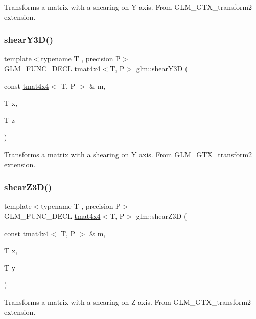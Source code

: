Transforms a matrix with a shearing on Y axis. From G\+L\+M\+\_\+\+G\+T\+X\+\_\+transform2 extension. \mbox{\label{group__gtx__transform2_ga31253ea18fdcdfde08c134c8b67688f7}} 
\subsubsection{\texorpdfstring{shear\+Y3\+D()}{shearY3D()}}
{\footnotesize\ttfamily template$<$typename T , precision P$>$ \\
G\+L\+M\+\_\+\+F\+U\+N\+C\+\_\+\+D\+E\+CL \hyperlink{structglm_1_1tmat4x4}{tmat4x4}$<$T, P$>$ glm\+::shear\+Y3D (\begin{DoxyParamCaption}\item[{const \hyperlink{structglm_1_1tmat4x4}{tmat4x4}$<$ T, P $>$ \&}]{m,  }\item[{T}]{x,  }\item[{T}]{z }\end{DoxyParamCaption})}

Transforms a matrix with a shearing on Y axis. From G\+L\+M\+\_\+\+G\+T\+X\+\_\+transform2 extension. \mbox{\label{group__gtx__transform2_ga5558ac64a7144685bf2eb4483a0e2f51}} 
\subsubsection{\texorpdfstring{shear\+Z3\+D()}{shearZ3D()}}
{\footnotesize\ttfamily template$<$typename T , precision P$>$ \\
G\+L\+M\+\_\+\+F\+U\+N\+C\+\_\+\+D\+E\+CL \hyperlink{structglm_1_1tmat4x4}{tmat4x4}$<$T, P$>$ glm\+::shear\+Z3D (\begin{DoxyParamCaption}\item[{const \hyperlink{structglm_1_1tmat4x4}{tmat4x4}$<$ T, P $>$ \&}]{m,  }\item[{T}]{x,  }\item[{T}]{y }\end{DoxyParamCaption})}

Transforms a matrix with a shearing on Z axis. From G\+L\+M\+\_\+\+G\+T\+X\+\_\+transform2 extension. 